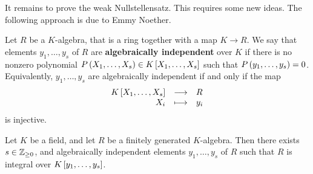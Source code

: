 It remains to prove the weak Nullstellensatz. This requires some new ideas. The following approach is due to Emmy Noether.

\pagebreak

\begin{definition}
Let $ R $ be a $ K $-algebra, that is a ring together with a map $ K \to R $. We say that elements $ y_1, \dots, y_s $ of $ R $ are \textbf{algebraically independent} over $ K $ if there is no nonzero polynomial $ P\br{X_1, \dots, X_s} \in K\sbr{X_1, \dots, X_s} $ such that $ P\br{y_1, \dots, y_s} = 0 $. Equivalently, $ y_1, \dots, y_s $ are algebraically independent if and only if the map
$$ \function{K\sbr{X_1, \dots, X_s}}{R}{X_i}{y_i} $$
is injective.
\end{definition}

\begin{proposition}
Let $ K $ be a field, and let $ R $ be a finitely generated $ K $-algebra. Then there exists $ s \in \mathbb{Z}_{\ge 0} $, and algebraically independent elements $ y_1, \dots, y_s $ of $ R $ such that $ R $ is integral over $ K\sbr{y_1, \dots, y_s} $.
\end{proposition}

